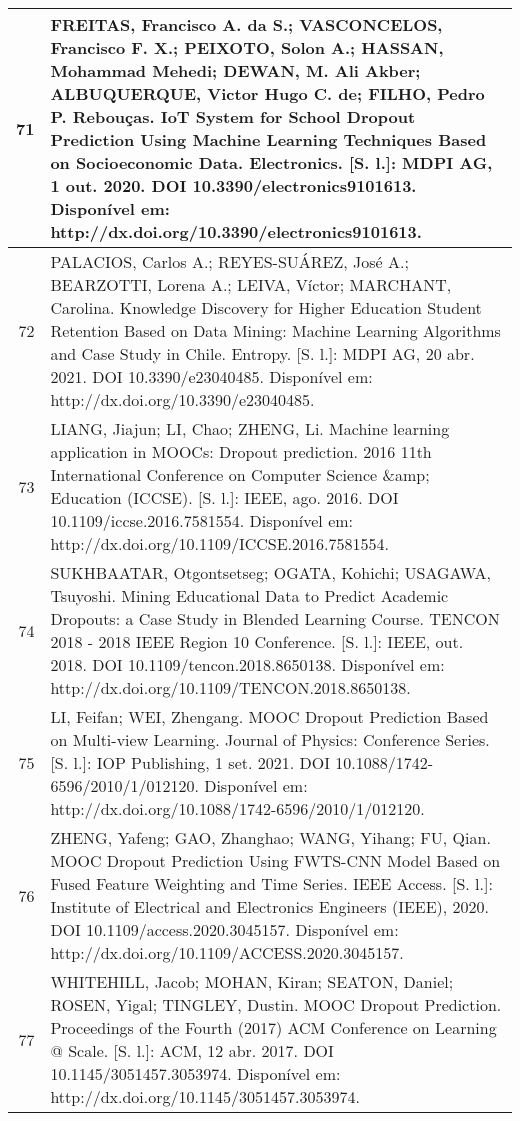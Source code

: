 \begin{apendicesenv}
\begin{longtable}[c]{|r|l|}
71 &
  \multicolumn{1}{p{14.5cm}|}{FREITAS, Francisco A. da S.; VASCONCELOS, Francisco F. X.; PEIXOTO, Solon A.; HASSAN, Mohammad Mehedi; DEWAN, M. Ali Akber; ALBUQUERQUE, Victor Hugo C. de; FILHO, Pedro P. Rebouças. IoT System for School Dropout Prediction Using Machine Learning Techniques Based on Socioeconomic Data. Electronics. {[}S. l.{]}: MDPI AG, 1 out. 2020. DOI 10.3390/electronics9101613. Disponível em: http://dx.doi.org/10.3390/electronics9101613.} \\ \hline
72 &
  \multicolumn{1}{p{14.5cm}|}{PALACIOS, Carlos A.; REYES-SUÁREZ, José A.; BEARZOTTI, Lorena A.; LEIVA, Víctor; MARCHANT, Carolina. Knowledge Discovery for Higher Education Student Retention Based on Data Mining: Machine Learning Algorithms and Case Study in Chile. Entropy. {[}S. l.{]}: MDPI AG, 20 abr. 2021. DOI 10.3390/e23040485. Disponível em: http://dx.doi.org/10.3390/e23040485.} \\ \hline
73 &
  \multicolumn{1}{p{14.5cm}|}{LIANG, Jiajun; LI, Chao; ZHENG, Li. Machine learning application in MOOCs: Dropout prediction. 2016 11th International Conference on Computer Science \&amp; Education (ICCSE). {[}S. l.{]}: IEEE, ago. 2016. DOI 10.1109/iccse.2016.7581554. Disponível em: http://dx.doi.org/10.1109/ICCSE.2016.7581554.} \\ \hline
74 &
  \multicolumn{1}{p{14.5cm}|}{SUKHBAATAR, Otgontsetseg; OGATA, Kohichi; USAGAWA, Tsuyoshi. Mining Educational Data to Predict Academic Dropouts: a Case Study in Blended Learning Course. TENCON 2018 - 2018 IEEE Region 10 Conference. {[}S. l.{]}: IEEE, out. 2018. DOI 10.1109/tencon.2018.8650138. Disponível em: http://dx.doi.org/10.1109/TENCON.2018.8650138.} \\ \hline
75 &
  \multicolumn{1}{p{14.5cm}|}{LI, Feifan; WEI, Zhengang. MOOC Dropout Prediction Based on Multi-view Learning. Journal of Physics: Conference Series. {[}S. l.{]}: IOP Publishing, 1 set. 2021. DOI 10.1088/1742-6596/2010/1/012120. Disponível em: http://dx.doi.org/10.1088/1742-6596/2010/1/012120.} \\ \hline
76 &
  \multicolumn{1}{p{14.5cm}|}{ZHENG, Yafeng; GAO, Zhanghao; WANG, Yihang; FU, Qian. MOOC Dropout Prediction Using FWTS-CNN Model Based on Fused Feature Weighting and Time Series. IEEE Access. {[}S. l.{]}: Institute of Electrical and Electronics Engineers (IEEE), 2020. DOI 10.1109/access.2020.3045157. Disponível em: http://dx.doi.org/10.1109/ACCESS.2020.3045157.} \\ \hline
77 &
  \multicolumn{1}{p{14.5cm}|}{WHITEHILL, Jacob; MOHAN, Kiran; SEATON, Daniel; ROSEN, Yigal; TINGLEY, Dustin. MOOC Dropout Prediction. Proceedings of the Fourth (2017) ACM Conference on Learning @ Scale. {[}S. l.{]}: ACM, 12 abr. 2017. DOI 10.1145/3051457.3053974. Disponível em: http://dx.doi.org/10.1145/3051457.3053974.} \\ \hline

\end{longtable}
\end{apendicesenv}
